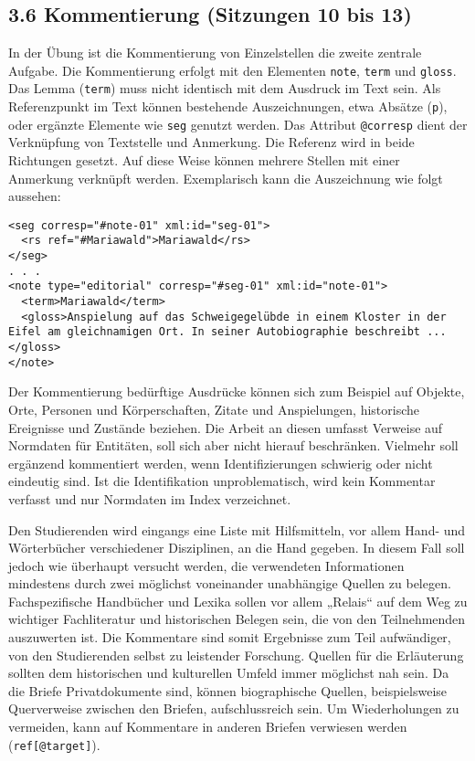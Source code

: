 \documentclass[
          a4paper,
        ]{article}
\newcommand{\passthrough}[1]{#1}
\begin{document}
\subsection{3.6 Kommentierung (Sitzungen 10 bis
13)}\label{kommentierung-sitzungen-10-bis-13}

In der Übung ist die Kommentierung von Einzelstellen die zweite zentrale
Aufgabe. Die Kommentierung erfolgt mit den Elementen
\passthrough{\lstinline!note!}, \passthrough{\lstinline!term!} und
\passthrough{\lstinline!gloss!}. Das Lemma
(\passthrough{\lstinline!term!}) muss nicht identisch mit dem Ausdruck
im Text sein. Als Referenzpunkt im Text können bestehende
Auszeichnungen, etwa Absätze (\passthrough{\lstinline!p!}), oder
ergänzte Elemente wie \passthrough{\lstinline!seg!} genutzt werden. Das
Attribut \passthrough{\lstinline!@corresp!} dient der Verknüpfung von
Textstelle und Anmerkung. Die Referenz wird in beide Richtungen gesetzt.
Auf diese Weise können mehrere Stellen mit einer Anmerkung verknüpft
werden. Exemplarisch kann die Auszeichnung wie folgt aussehen:

\begin{lstlisting}
<seg corresp="#note-01" xml:id="seg-01">
  <rs ref="#Mariawald">Mariawald</rs>
</seg>
. . .
<note type="editorial" corresp="#seg-01" xml:id="note-01">
  <term>Mariawald</term>
  <gloss>Anspielung auf das Schweigegelübde in einem Kloster in der Eifel am gleichnamigen Ort. In seiner Autobiographie beschreibt ...</gloss>
</note>
\end{lstlisting}

Der Kommentierung bedürftige Ausdrücke können sich zum Beispiel auf
Objekte, Orte, Personen und Körperschaften, Zitate und Anspielungen,
historische Ereignisse und Zustände beziehen. Die Arbeit an diesen
umfasst Verweise auf Normdaten für Entitäten, soll sich aber nicht
hierauf beschränken. Vielmehr soll ergänzend kommentiert werden, wenn
Identifizierungen schwierig oder nicht eindeutig sind. Ist die
Identifikation unproblematisch, wird kein Kommentar verfasst und nur
Normdaten im Index verzeichnet.

Den Studierenden wird eingangs eine Liste mit Hilfsmitteln, vor allem
Hand- und Wörterbücher verschiedener Disziplinen, an die Hand gegeben.
In diesem Fall soll jedoch wie überhaupt versucht werden, die
verwendeten Informationen mindestens durch zwei möglichst voneinander
unabhängige Quellen zu belegen. Fachspezifische Handbücher und Lexika
sollen vor allem „Relais`` auf dem Weg zu wichtiger Fachliteratur und
historischen Belegen sein, die von den Teilnehmenden auszuwerten ist.
Die Kommentare sind somit Ergebnisse zum Teil aufwändiger, von den
Studierenden selbst zu leistender Forschung. Quellen für die Erläuterung
sollten dem historischen und kulturellen Umfeld immer möglichst nah
sein. Da die Briefe Privatdokumente sind, können biographische Quellen,
beispielsweise Querverweise zwischen den Briefen, aufschlussreich sein.
Um Wiederholungen zu vermeiden, kann auf Kommentare in anderen Briefen
verwiesen werden (\passthrough{\lstinline!ref[@target]!}).
\end{document}
